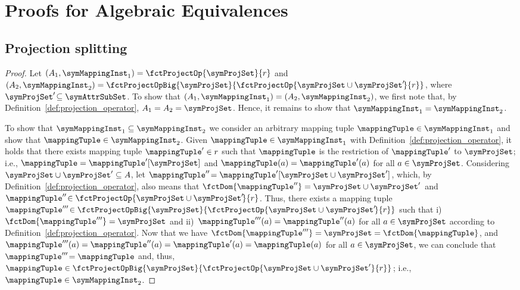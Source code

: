 
\section{Proofs for Algebraic Equivalences}

\subsection{Projection splitting}
\label{proof:proj_splitting}
\begin{proof}
    Let $(A_1, \symMappingInst_1) = \fctProjectOp{\symProjSet}{r}$ and $(A_2, \symMappingInst_2) = \fctProjectOpBig{\symProjSet}{\fctProjectOp{\symProjSet\cup\symProjSet'\!}{r}}$, 
    where $\symProjSet'\! \subseteq \symAttrSubSet$. 
    To show that $(A_1, \symMappingInst_1) = (A_2, \symMappingInst_2)$, we first note that, by Definition~\ref{def:projection_operator}, $A_1 = A_2 = \symProjSet$.
    Hence, it remains to show that $\symMappingInst_1 = \symMappingInst_2$. 

    To show that $\symMappingInst_1 \subseteq \symMappingInst_2$ we consider an arbitrary 
    mapping tuple $\mappingTuple \in \symMappingInst_1$ and show that $\mappingTuple \in \symMappingInst_2$. 
    Given $\mappingTuple \in \symMappingInst_1$ with
    Definition~\ref{def:projection_operator}, it holds that there exists
    mapping tuple $\mappingTuple' \in r$ such that $\mappingTuple$ is the 
    restriction of $\mappingTuple'$  to $\symProjSet$; i.e., $\mappingTuple = \mappingTuple'[\symProjSet]$ and 
    $\mappingTuple(a) = \mappingTuple'(a)$ for all $a \in \symProjSet$. 
    Considering $\symProjSet \cup \symProjSet' \subseteq A$, let $\mappingTuple''\! =
    \mappingTuple'[\symProjSet \cup \symProjSet']$, which, by
    Definition~\ref{def:projection_operator}, also means that
    $\fctDom{\mappingTuple''} = \symProjSet \cup \symProjSet'$ and $\mappingTuple''\! \in
    \fctProjectOp{\symProjSet \cup \symProjSet'\!}{r}$.
    Thus, there exists a mapping tuple 
    $\mappingTuple'''\! \in \fctProjectOpBig{\symProjSet}{ \fctProjectOp{\symProjSet\cup\symProjSet'\!}{r} }$
    such that i)~$\fctDom{\mappingTuple'''} = \symProjSet$ and ii)~$\mappingTuple'''(a) = \mappingTuple''(a)$ for all 
    $a \in \symProjSet$ according to Definition~\ref{def:projection_operator}.
    Now that we have $\fctDom{\mappingTuple'''} = \symProjSet = \fctDom{\mappingTuple}$, and 
    $\mappingTuple'''(a) =  \mappingTuple''(a)= \mappingTuple'(a)= \mappingTuple(a)$ for all $a \in \symProjSet$, 
    we can conclude that $\mappingTuple'''\! =  \mappingTuple$ and, thus,
    $\mappingTuple \in \fctProjectOpBig{\symProjSet}{\fctProjectOp{\symProjSet\cup\symProjSet'}{r}}$; i.e., $\mappingTuple  \in \symMappingInst_2$.


\end{proof}
